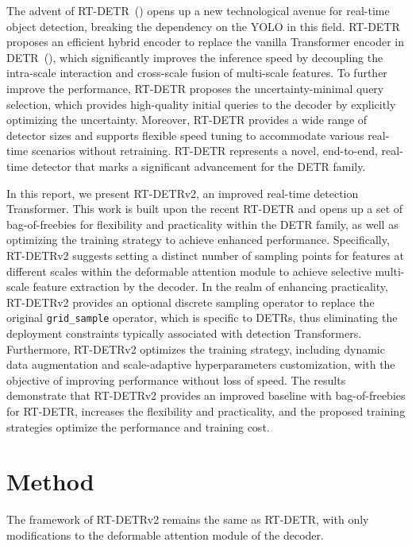 \documentclass{article}
\begin{document}
The advent of RT-DETR~(\cite{zhao2024detrs}) opens up a new technological avenue for real-time object detection, breaking the dependency on the YOLO in this field.
RT-DETR proposes an efficient hybrid encoder to replace the vanilla Transformer encoder in DETR~(\cite{carion2020end}), which significantly improves the inference speed by decoupling the intra-scale interaction and cross-scale fusion of multi-scale features.
To further improve the performance, RT-DETR proposes the uncertainty-minimal query selection, which provides high-quality initial queries to the decoder by explicitly optimizing the uncertainty.
Moreover, RT-DETR provides a wide range of detector sizes and supports flexible speed tuning to accommodate various real-time scenarios without retraining.
RT-DETR represents a novel, end-to-end, real-time detector that marks a significant advancement for the DETR family.

In this report, we present RT-DETRv2, an improved real-time detection Transformer.
This work is built upon the recent RT-DETR and opens up a set of bag-of-freebies for flexibility and practicality within the DETR family, as well as optimizing the training strategy to achieve enhanced performance.
Specifically, RT-DETRv2 suggests setting a distinct number of sampling points for features at different scales within the deformable attention module to achieve selective multi-scale feature extraction by the decoder.
In the realm of enhancing practicality, RT-DETRv2 provides an optional discrete sampling operator to replace the original \texttt{grid\_sample} operator, which is specific to DETRs, thus eliminating the deployment constraints typically associated with detection Transformers.
Furthermore, RT-DETRv2 optimizes the training strategy, including dynamic data augmentation and scale-adaptive hyperparameters customization, with the objective of improving performance without loss of speed.
The results demonstrate that RT-DETRv2 provides an improved baseline with bag-of-freebies for RT-DETR, increases the flexibility and practicality, and the proposed training strategies optimize the performance and training cost.

\section{Method}
The framework of RT-DETRv2 remains the same as RT-DETR, with only modifications to the deformable attention module of the decoder.
\end{document}
